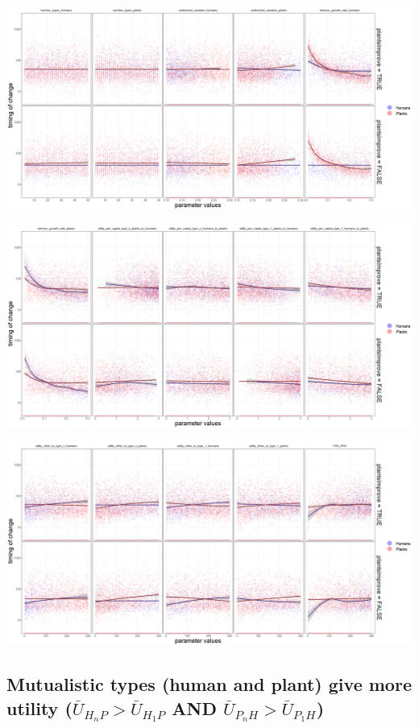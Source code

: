 \documentclass[
]{book}
\begin{document}
\includegraphics[width=1\linewidth]{plots/5_LHS_plantsImprove_timing_bifurcationPlot_twoVariables_per_parameter_and_scenario_part1}

\includegraphics[width=1\linewidth]{plots/5_LHS_plantsImprove_timing_bifurcationPlot_twoVariables_per_parameter_and_scenario_part2}

\includegraphics[width=1\linewidth]{plots/5_LHS_plantsImprove_timing_bifurcationPlot_twoVariables_per_parameter_and_scenario_part3}

\newpage

\hypertarget{mutualistic-types-human-and-plant-give-more-utility-baru_h_np-baru_h_1p-and-baru_p_nh-baru_p_1h}{%
\subsection{\texorpdfstring{Mutualistic types (human and plant) give more utility (\(\bar{U}_{H_{n}P}> \bar{U}_{H_{1}P}\) AND \(\bar{U}_{P_{n}H}> \bar{U}_{P_{1}H}\))}{Mutualistic types (human and plant) give more utility (\textbackslash bar\{U\}\_\{H\_\{n\}P\}\textgreater{} \textbackslash bar\{U\}\_\{H\_\{1\}P\} AND \textbackslash bar\{U\}\_\{P\_\{n\}H\}\textgreater{} \textbackslash bar\{U\}\_\{P\_\{1\}H\})}}\label{mutualistic-types-human-and-plant-give-more-utility-baru_h_np-baru_h_1p-and-baru_p_nh-baru_p_1h}}
\end{document}
